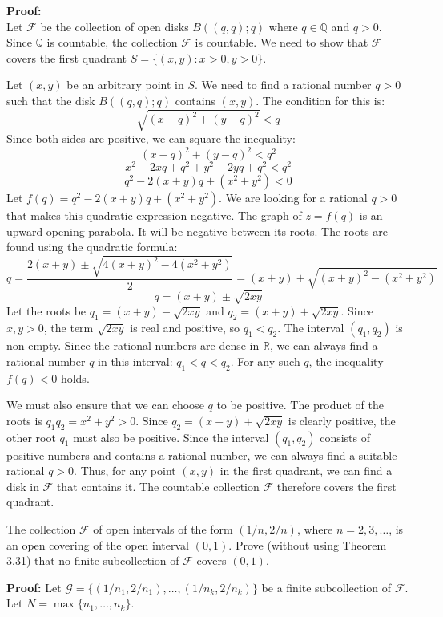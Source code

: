 \textbf{Proof:}\\
Let $\mathcal{F}$ be the collection of open disks $B((q,q); q)$ where $q \in \mathbb{Q}$ and $q > 0$. Since $\mathbb{Q}$ is countable, the collection $\mathcal{F}$ is countable. We need to show that $\mathcal{F}$ covers the first quadrant $S = \{(x, y) : x > 0, y > 0\}$.

Let $(x, y)$ be an arbitrary point in $S$. We need to find a rational number $q > 0$ such that the disk $B((q,q); q)$ contains $(x, y)$. The condition for this is:
$$\sqrt{(x-q)^2 + (y-q)^2} < q$$
Since both sides are positive, we can square the inequality:
$$(x-q)^2 + (y-q)^2 < q^2$$
$$x^2 - 2xq + q^2 + y^2 - 2yq + q^2 < q^2$$
$$q^2 - 2(x+y)q + (x^2+y^2) < 0$$
Let $f(q) = q^2 - 2(x+y)q + (x^2+y^2)$. We are looking for a rational $q > 0$ that makes this quadratic expression negative. The graph of $z=f(q)$ is an upward-opening parabola. It will be negative between its roots. The roots are found using the quadratic formula:
$$q = \frac{2(x+y) \pm \sqrt{4(x+y)^2 - 4(x^2+y^2)}}{2} = (x+y) \pm \sqrt{(x+y)^2 - (x^2+y^2)}$$
$$q = (x+y) \pm \sqrt{2xy}$$
Let the roots be $q_1 = (x+y) - \sqrt{2xy}$ and $q_2 = (x+y) + \sqrt{2xy}$. Since $x,y > 0$, the term $\sqrt{2xy}$ is real and positive, so $q_1 < q_2$. The interval $(q_1, q_2)$ is non-empty.
Since the rational numbers are dense in $\mathbb{R}$, we can always find a rational number $q$ in this interval: $q_1 < q < q_2$. For any such $q$, the inequality $f(q) < 0$ holds.

We must also ensure that we can choose $q$ to be positive. The product of the roots is $q_1 q_2 = x^2+y^2 > 0$. Since $q_2 = (x+y) + \sqrt{2xy}$ is clearly positive, the other root $q_1$ must also be positive.
Since the interval $(q_1, q_2)$ consists of positive numbers and contains a rational number, we can always find a suitable rational $q > 0$.
Thus, for any point $(x,y)$ in the first quadrant, we can find a disk in $\mathcal{F}$ that contains it. The countable collection $\mathcal{F}$ therefore covers the first quadrant.


\begin{problembox}
The collection \( \mathcal{F} \) of open intervals of the form \( (1/n, 2/n) \), where \( n = 2, 3, \ldots \), is an open covering of the open interval \( (0, 1) \). Prove (without using Theorem 3.31) that no finite subcollection of \( \mathcal{F} \) covers \( (0, 1) \).
\end{problembox}

\textbf{Proof:} Let $\mathcal{G} = \{(1/n_1, 2/n_1), \ldots, (1/n_k, 2/n_k)\}$ be a finite subcollection of $\mathcal{F}$. Let $N = \max\{n_1, \ldots, n_k\}$.


